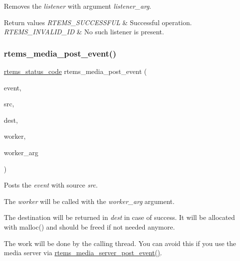 Removes the {\itshape listener} with argument {\itshape listener\+\_\+arg}. 


\begin{DoxyRetVals}{Return values}
{\em R\+T\+E\+M\+S\+\_\+\+S\+U\+C\+C\+E\+S\+S\+F\+UL} & Successful operation. \\
\hline
{\em R\+T\+E\+M\+S\+\_\+\+I\+N\+V\+A\+L\+I\+D\+\_\+\+ID} & No such listener is present. \\
\hline
\end{DoxyRetVals}
\mbox{\label{group__RTEMSIOMedia_ga1904455ab5f9099298ff4d78fd60d3d4}} 
\subsubsection{\texorpdfstring{rtems\_media\_post\_event()}{rtems\_media\_post\_event()}}
{\footnotesize\ttfamily \mbox{\hyperlink{group__ClassicStatus_ga545d41846817eaba6143d52ee4d9e9fe}{rtems\+\_\+status\+\_\+code}} rtems\+\_\+media\+\_\+post\+\_\+event (\begin{DoxyParamCaption}\item[{\mbox{\hyperlink{group__RTEMSIOMedia_gadd58c5799ee997413d4d6be2ac05197b}{rtems\+\_\+media\+\_\+event}}}]{event,  }\item[{const char $\ast$}]{src,  }\item[{char $\ast$$\ast$}]{dest,  }\item[{\mbox{\hyperlink{group__RTEMSIOMedia_ga4d3df16c316c9285e61bf0f735cafdd3}{rtems\+\_\+media\+\_\+worker}}}]{worker,  }\item[{void $\ast$}]{worker\+\_\+arg }\end{DoxyParamCaption})}



Posts the {\itshape event} with source {\itshape src}. 

The {\itshape worker} will be called with the {\itshape worker\+\_\+arg} argument.

The destination will be returned in {\itshape dest} in case of success. It will be allocated with malloc() and should be freed if not needed anymore.

The work will be done by the calling thread. You can avoid this if you use the media server via \mbox{\hyperlink{group__RTEMSIOMedia_gabe2acca9a30bcd62765c0b1c810ba89e}{rtems\+\_\+media\+\_\+server\+\_\+post\+\_\+event()}}.


